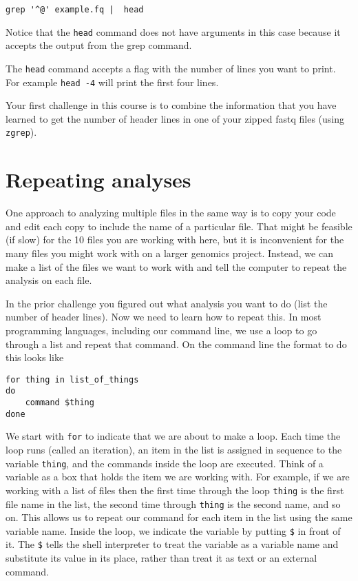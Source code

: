\documentclass[
]{book}
\begin{document}
\begin{verbatim}
grep '^@' example.fq |  head
\end{verbatim}

Notice that the \texttt{head} command does not have arguments in this case because it accepts the output from the grep command.

The \texttt{head} command accepts a flag with the number of lines you want to print.
For example \texttt{head\ -4} will print the first four lines.

Your first challenge in this course is to combine the information that you have learned to get the number of header lines in one of your zipped fastq files (using \texttt{zgrep}).

\hypertarget{repeating-analyses}{%
\section{Repeating analyses}\label{repeating-analyses}}

One approach to analyzing multiple files in the same way is to copy your code and edit each copy to include the name of a particular file. That might be feasible (if slow) for the 10 files you are working with here, but it is inconvenient for the many files you might work with on a larger genomics project. Instead, we can make a list of the files we want to work with and tell the computer to repeat the analysis on each file.

In the prior challenge you figured out what analysis you want to do (list the number of header lines). Now we need to learn how to repeat this. In most programming languages, including our command line, we use a loop to go through a list and repeat that command. On the command line the format to do this looks like

\begin{verbatim}
for thing in list_of_things
do
    command $thing
done
\end{verbatim}

We start with \texttt{for} to indicate that we are about to make a loop.
Each time the loop runs (called an iteration), an item in the list is assigned in sequence to the variable \texttt{thing}, and the commands inside the loop are executed.
Think of a variable as a box that holds the item we are working with.
For example, if we are working with a list of files then the first time
through the loop \texttt{thing} is the first file name in the list,
the second time through \texttt{thing} is the second name, and so on.
This allows us to repeat our command for each item in the list using the same variable name.
Inside the loop, we indicate the variable by putting \texttt{\$} in front of it.
The \texttt{\$} tells the shell interpreter to treat the variable as a variable name and substitute its value in its place, rather than treat it as text or an external command.
\end{document}
